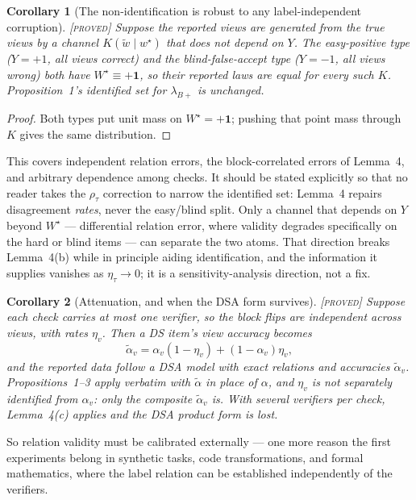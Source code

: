 \documentclass[11pt]{article}
\newtheorem{corollary}{Corollary}
\theoremstyle{remark}
\newcommand{\status}[1]{\hfill{\normalfont\small\textsc{[#1]}}}
\newcommand{\one}{\mathbf{1}}
\begin{document}
\begin{corollary}[The non-identification is robust to any label-independent corruption]\status{proved}
Suppose the reported views are generated from the true views by a channel $K(\widetilde w\mid w^\star)$ that does not depend on $Y$. The easy-positive type ($Y=+1$, all views correct) and the blind-false-accept type ($Y=-1$, all views wrong) both have $W^\star\equiv+\one$, so their reported laws are equal for every such $K$. Proposition~1's identified set for $\lambda_{B+}$ is unchanged.
\end{corollary}
\begin{proof}
Both types put unit mass on $W^\star=+\one$; pushing that point mass through $K$ gives the same distribution.
\end{proof}

This covers independent relation errors, the block-correlated errors of Lemma~4, and arbitrary dependence among checks. It should be stated explicitly so that no reader takes the $\rho_\tau$ correction to narrow the identified set: Lemma~4 repairs disagreement \emph{rates}, never the easy/blind split. Only a channel that depends on $Y$ beyond $W^\star$ --- differential relation error, where validity degrades specifically on the hard or blind items --- can separate the two atoms. That direction breaks Lemma~4(b) while in principle aiding identification, and the information it supplies vanishes as $\eta_\tau\to0$; it is a sensitivity-analysis direction, not a fix.

\begin{corollary}[Attenuation, and when the DSA form survives]\status{proved}
Suppose each check carries at most one verifier, so the block flips are independent across views, with rates $\eta_v$. Then a DS item's view accuracy becomes
\[
\tilde\alpha_v=\alpha_v(1-\eta_v)+(1-\alpha_v)\eta_v ,
\]
and the reported data follow a DSA model with exact relations and accuracies $\tilde\alpha_v$. Propositions~1--3 apply verbatim with $\tilde\alpha$ in place of $\alpha$, and $\eta_v$ is not separately identified from $\alpha_v$: only the composite $\tilde\alpha_v$ is. With several verifiers per check, Lemma~4(c) applies and the DSA product form is lost.
\end{corollary}

So relation validity must be calibrated externally --- one more reason the first experiments belong in synthetic tasks, code transformations, and formal mathematics, where the label relation can be established independently of the verifiers.
\end{document}
